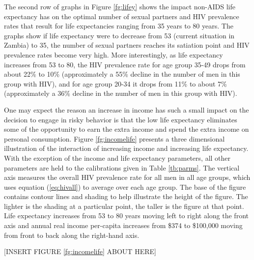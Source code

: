 \documentclass[12pt]{article}
\begin{document}
The second row of graphs in Figure \ref{fg:lifey} shows the impact non-AIDS life expectancy has on the optimal number of sexual partners and HIV prevalence rates that result for life expectancies ranging from 35 years to 80 years.  The graphs show if life expectancy were to decrease from 53 (current situation in Zambia) to 35, the number of sexual partners reaches its satiation point and HIV prevalence rates become very high.  More interestingly, as life expectancy increases from 53 to 80, the HIV prevalence rate for age group 35-49 drops from about 22\% to 10\% (approximately a 55\% decline in the number of men in this group with HIV), and for age group 20-34 it drops from 11\% to about 7\% (approximately a 36\% decline in the number of men in this group with HIV).

One may expect the reason an increase in income has such a small impact on the decision to engage in risky behavior is that the low life expectancy eliminates some of the opportunity to earn the extra income and spend the extra income on personal consumption.  Figure \ref{fg:incomelife} presents a three dimensional illustration of the interaction of increasing income and increasing life expectancy.  With the exception of the income and life expectancy parameters, all other parameters are held to the calibrations given in Table \ref{tb:parms}.  The vertical axis measures the overall HIV prevalence rate for all men in all age groups, which uses equation (\ref{eq:hivall}) to average over each age group.  The base of the figure contains contour lines and shading to help illustrate the height of the figure.  The lighter is the shading at a particular point, the taller is the figure at that point.  Life expectancy increases from 53 to 80 years moving left to right along the front axis and annual real income per-capita increases from \$374 to \$100,000 moving from front to back along the right-hand axis.

\begin{center}[INSERT FIGURE \ref{fg:incomelife} ABOUT HERE]\end{center}
\end{document}
